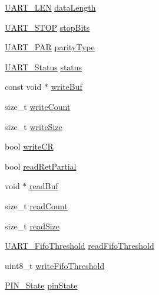 \begin{DoxyCompactItemize}
\hyperlink{_u_a_r_t_8h_adf245d5f10db0abcbd8ad62a0d80c694}{U\+A\+R\+T\+\_\+\+L\+E\+N} \hyperlink{struct_u_a_r_t_c_c26_x_x___object_a2f9a4fa7ee40a43897a2df10d936ab0f}{data\+Length}
\item 
\hyperlink{_u_a_r_t_8h_a176b71ca19bc13d7534fa30fc18c2243}{U\+A\+R\+T\+\_\+\+S\+T\+O\+P} \hyperlink{struct_u_a_r_t_c_c26_x_x___object_ae5a931f5b2f5de1c3aa6852856ca1b4a}{stop\+Bits}
\item 
\hyperlink{_u_a_r_t_8h_ac70b5aa75500b8c45a51ec560deccfc4}{U\+A\+R\+T\+\_\+\+P\+A\+R} \hyperlink{struct_u_a_r_t_c_c26_x_x___object_ab42ca16e6fc784e7d0a727b1e9c6b299}{parity\+Type}
\item 
\hyperlink{_u_a_r_t_c_c26_x_x_8h_a778bbef5f4b52a5651552136715f53c4}{U\+A\+R\+T\+\_\+\+Status} \hyperlink{struct_u_a_r_t_c_c26_x_x___object_a10ff4c367c40263e72d3494f78b9ce07}{status}
\item 
const void $\ast$ \hyperlink{struct_u_a_r_t_c_c26_x_x___object_a440f4f4b165c4c725e544f13ad9ed02b}{write\+Buf}
\item 
size\+\_\+t \hyperlink{struct_u_a_r_t_c_c26_x_x___object_ac1e9fe4a759db1bb57ea9e50af9b08c2}{write\+Count}
\item 
size\+\_\+t \hyperlink{struct_u_a_r_t_c_c26_x_x___object_a6532e1f4a50fcf7e6908f7502a64fea6}{write\+Size}
\item 
bool \hyperlink{struct_u_a_r_t_c_c26_x_x___object_adc03957f1fbafe66c14fd7d9308a5e71}{write\+C\+R}
\item 
bool \hyperlink{struct_u_a_r_t_c_c26_x_x___object_af8d33692f51db0e0874b0568e7011e78}{read\+Ret\+Partial}
\item 
void $\ast$ \hyperlink{struct_u_a_r_t_c_c26_x_x___object_a9672e42f229731578af8a2c81f3f84db}{read\+Buf}
\item 
size\+\_\+t \hyperlink{struct_u_a_r_t_c_c26_x_x___object_a860c348843ce491dc8787304ddc84f38}{read\+Count}
\item 
size\+\_\+t \hyperlink{struct_u_a_r_t_c_c26_x_x___object_abefd4ca2a4db441a73e8b373a6947f85}{read\+Size}
\item 
\hyperlink{_u_a_r_t_c_c26_x_x_8h_a292a5e751577698b215f5e8aa1c79e99}{U\+A\+R\+T\+\_\+\+Fifo\+Threshold} \hyperlink{struct_u_a_r_t_c_c26_x_x___object_a8d3886d0973101575bac69dc7bf5d587}{read\+Fifo\+Threshold}
\item 
uint8\+\_\+t \hyperlink{struct_u_a_r_t_c_c26_x_x___object_aad6be8e2a10e4a97ef30de3bc00f74d6}{write\+Fifo\+Threshold}
\item 
\hyperlink{_p_i_n_8h_a36ef69d50df6baa6973482669c24a522}{P\+I\+N\+\_\+\+State} \hyperlink{struct_u_a_r_t_c_c26_x_x___object_a5a12b2fd3f28ae68e2c4c6ddd2f38eb8}{pin\+State}

\end{DoxyCompactItemize}
